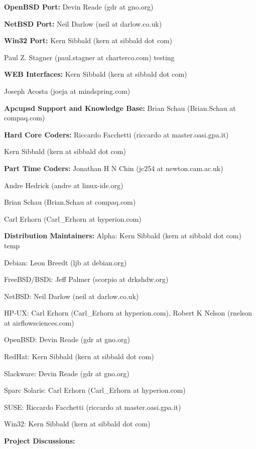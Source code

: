 \begin{description}
\item {\bf OpenBSD Port:}
Devin Reade (gdr at gno.org)  

\item {\bf NetBSD Port:}
Neil Darlow (neil at darlow.co.uk)  

\item {\bf Win32 Port:}
Kern Sibbald (kern at sibbald dot com)  

Paul Z. Stagner (paul.stagner at charterco.com) testing  

\item {\bf WEB Interfaces:}
Kern Sibbald (kern at sibbald dot com)  

Joseph Acosta (joeja at mindspring.com)  

\item {\bf Apcupsd Support and Knowledge Base:}
Brian Schau (Brian.Schau at compaq.com)  

\item {\bf Hard Core Coders:}
Riccardo Facchetti (riccardo at master.oasi.gpa.it)  

Kern Sibbald (kern at sibbald dot com)  

\item {\bf Part Time Coders:}
Jonathan H N Chin (jc254 at newton.cam.ac.uk)  

Andre Hedrick (andre at linux-ide.org)  

Brian Schau (Brian.Schau at compaq.com)  

Carl Erhorn (Carl\_Erhorn at hyperion.com)  

\item {\bf Distribution Maintainers:}
Alpha: Kern Sibbald (kern at sibbald dot com) temp  

Debian: Leon Breedt (ljb at debian.org)  

FreeBSD/BSDi: Jeff Palmer (scorpio at drkshdw.org)  

NetBSD: Neil Darlow (neil at darlow.co.uk)  

HP-UX: Carl Erhorn (Carl\_Erhorn at hyperion.com), Robert K Nelson (rnelson at
airflowsciences.com)  

OpenBSD: Devin Reade (gdr at gno.org)  

RedHat: Kern Sibbald (kern at sibbald dot com)  

Slackware: Devin Reade (gdr at gno.org)  

Sparc Solaris: Carl Erhorn (Carl\_Erhorn at hyperion.com)  

SUSE: Riccardo Facchetti (riccardo at master.oasi.gpa.it)  

Win32: Kern Sibbald (kern at sibbald dot com)  

\item {\bf Project Discussions:}
\end{description}

